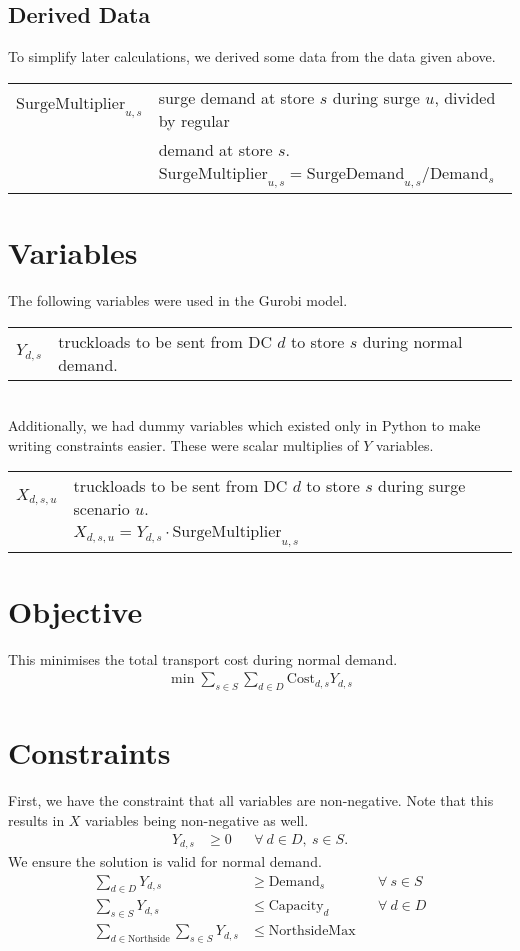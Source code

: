 \documentclass[11pt,a4paper]{article}
\begin{document}
\subsection{Derived Data}
To simplify later calculations, we derived some data from the data given above.\\[0.8em]    
\begin{tabular}{l l}
    $\mathrm{SurgeMultiplier}_{u,s}$ & surge demand at store $s$ during surge $u$,  divided by regular \\ 
    &  demand at store $s$. \\ 
    &$\mathrm{SurgeMultiplier}_{u,s} = \mathrm{SurgeDemand}_{u,s} / \mathrm{Demand}_s $
\end{tabular}

\section{Variables}
The following variables were used in the Gurobi model.\\[0.8em]
\begin{tabular}{l l}
    $Y_{d,s}$ & truckloads to be sent from DC $d$ to store $s$ during normal demand.
\end{tabular}
\\[0.8em]
\noindent Additionally, we had dummy variables which existed only in Python to 
make writing constraints easier. These were scalar multiplies of $Y$ variables.\\[0.8em]
\begin{tabular}{l l}
    $X_{d,s,u}$ & truckloads to be sent from DC $d$ to store $s$ during 
    surge scenario $u$. \\ 
    & $X_{d,s,u} = Y_{d,s} \cdot \mathrm{SurgeMultiplier}_{u,s}$
\end{tabular}

\section{Objective}
This minimises the total transport cost during normal demand.
\begin{align*}
    \min \sum_{s \in S} \sum_{d \in D} \mathrm{Cost}_{d, s} Y_{d,s}
\end{align*}

\section{Constraints}
First, we have the constraint that all variables are non-negative. Note that this results in 
$X$ variables being non-negative as well.
\begin{align*}
    Y_{d,s} &\ge 0 &&\forall~d \in D,~s \in S.
\end{align*}
We ensure the solution is valid for normal demand.
\begin{align*}
    \sum_{d \in D} Y_{d,s} &\ge \mathrm{Demand}_{s} &&\forall~s \in S \\ 
    \sum_{s \in S} Y_{d,s} &\le \mathrm{Capacity}_d &&\forall~d \in D \\ 
    \sum_{d \in \mathrm{Northside}} \sum_{s \in S} Y_{d,s} &\le \mathrm{NorthsideMax}
\end{align*}
\end{document}
